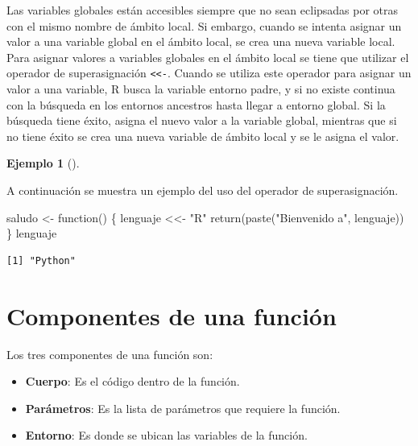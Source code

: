\documentclass[
  a4paper,
]{scrreport}
\newenvironment{Shaded}{\begin{snugshade}}{\end{snugshade}}
\newcommand{\ControlFlowTok}[1]{\textcolor[rgb]{0.00,0.23,0.31}{#1}}
\newcommand{\FunctionTok}[1]{\textcolor[rgb]{0.28,0.35,0.67}{#1}}
\newcommand{\NormalTok}[1]{\textcolor[rgb]{0.00,0.23,0.31}{#1}}
\newcommand{\OtherTok}[1]{\textcolor[rgb]{0.00,0.23,0.31}{#1}}
\newcommand{\StringTok}[1]{\textcolor[rgb]{0.13,0.47,0.30}{#1}}
\providecommand{\tightlist}{%
  \setlength{\itemsep}{0pt}\setlength{\parskip}{0pt}}\usepackage{longtable,booktabs,array}
\theoremstyle{definition}
\theoremstyle{definition}
\newtheorem{example}{Ejemplo}[chapter]
\theoremstyle{remark}
\begin{document}
Las variables globales están accesibles siempre que no sean eclipsadas
por otras con el mismo nombre de ámbito local. Si embargo, cuando se
intenta asignar un valor a una variable global en el ámbito local, se
crea una nueva variable local. Para asignar valores a variables globales
en el ámbito local se tiene que utilizar el operador de superasignación
\texttt{\textless{}\textless{}-}. Cuando se utiliza este operador para
asignar un valor a una variable, R busca la variable entorno padre, y si
no existe continua con la búsqueda en los entornos ancestros hasta
llegar a entorno global. Si la búsqueda tiene éxito, asigna el nuevo
valor a la variable global, mientras que si no tiene éxito se crea una
nueva variable de ámbito local y se le asigna el valor.

\leavevmode{}%
\begin{example}[]\label{exm-superasignacion}

A continuación se muestra un ejemplo del uso del operador de
superasignación.

\begin{Shaded}
\begin{Highlighting}[]
\NormalTok{saludo }\OtherTok{\textless{}{-}} \ControlFlowTok{function}\NormalTok{() \{}
\NormalTok{  lenguaje }\OtherTok{\textless{}\textless{}{-}} \StringTok{"R"}
  \FunctionTok{return}\NormalTok{(}\FunctionTok{paste}\NormalTok{(}\StringTok{"Bienvenido a"}\NormalTok{, lenguaje))}
\NormalTok{\}}
\NormalTok{lenguaje}
\end{Highlighting}
\end{Shaded}

\begin{verbatim}
[1] "Python"
\end{verbatim}

\end{example}

\hypertarget{componentes-de-una-funciuxf3n}{%
\section{Componentes de una
función}\label{componentes-de-una-funciuxf3n}}

Los tres componentes de una función son:

\begin{itemize}
\tightlist
\item
  \textbf{Cuerpo}: Es el código dentro de la función.
\item
  \textbf{Parámetros}: Es la lista de parámetros que requiere la
  función.
\item
  \textbf{Entorno}: Es donde se ubican las variables de la función.
\end{itemize}
\end{document}
